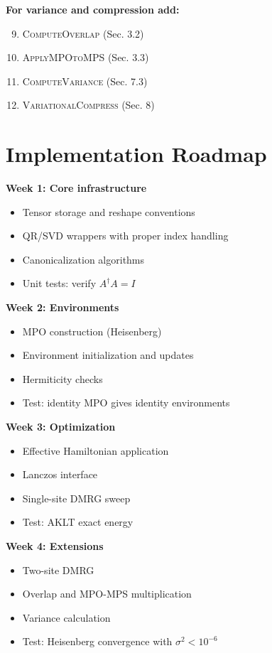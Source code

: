 \documentclass[aps,prb,onecolumn,scriptaddress]{revtex4-2}
\begin{document}
	\textbf{For variance and compression add:}
	\begin{enumerate}
		\setcounter{enumi}{8}
		\item \textsc{ComputeOverlap} (Sec. 3.2)
		\item \textsc{ApplyMPOtoMPS} (Sec. 3.3)
		\item \textsc{ComputeVariance} (Sec. 7.3)
		\item \textsc{VariationalCompress} (Sec. 8)
	\end{enumerate}
	
	\section{Implementation Roadmap}
	
	\textbf{Week 1: Core infrastructure}
	\begin{itemize}
		\item Tensor storage and reshape conventions
		\item QR/SVD wrappers with proper index handling
		\item Canonicalization algorithms
		\item Unit tests: verify $A^\dagger A = I$
	\end{itemize}
	
	\textbf{Week 2: Environments}
	\begin{itemize}
		\item MPO construction (Heisenberg)
		\item Environment initialization and updates
		\item Hermiticity checks
		\item Test: identity MPO gives identity environments
	\end{itemize}
	
	\textbf{Week 3: Optimization}
	\begin{itemize}
		\item Effective Hamiltonian application
		\item Lanczos interface
		\item Single-site DMRG sweep
		\item Test: AKLT exact energy
	\end{itemize}
	
	\textbf{Week 4: Extensions}
	\begin{itemize}
		\item Two-site DMRG
		\item Overlap and MPO-MPS multiplication
		\item Variance calculation
		\item Test: Heisenberg convergence with $\sigma^2 < 10^{-6}$
	\end{itemize}
	
\end{document}
